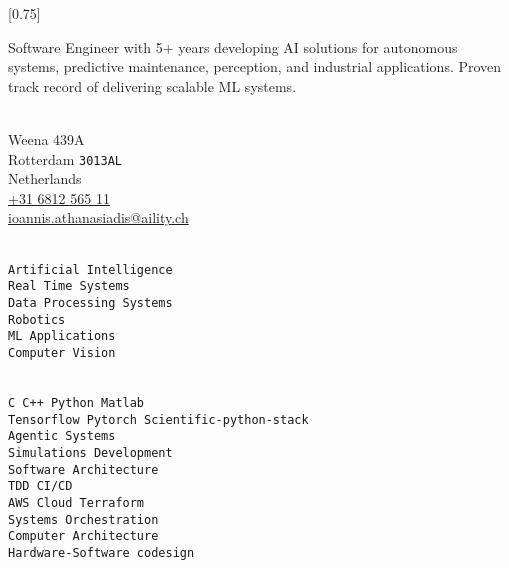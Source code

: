 \documentclass[lighthipster]{simplehipstercv}
\begin{document}
\setlength{\columnsep}{0.8cm}
[0.75]
\begin{paracol}{2}

\paracolbackgroundoptions


\footnotesize
{\setasidefontcolour
\flushright
\begin{center}
Software Engineer with 5+ years developing AI solutions for autonomous systems, predictive maintenance, perception, and industrial applications. Proven track record of delivering scalable ML systems.
\end{center}
\bigskip

\bigskip

\\[0.5em]
{\footnotesize
Weena 439A\\ %
Rotterdam \texttt{3013AL}\\
Netherlands\\[.2cm]
\href{tel:+31681256511}{+31 6812 565 11}\\ %
\href{mailto:ioannis.athanasiadis@aility.ch}{ioannis.athanasiadis@aility.ch}} %
\bigskip

\bigskip

\\[0.5em]
\texttt{Artificial Intelligence}\\[0.1em]
\texttt{Real Time Systems}\\[0.1em]
\texttt{Data Processing Systems}\\[0.1em]
\texttt{Robotics}\\[0.1em]
\texttt{ML Applications}\\[0.1em]
\texttt{Computer Vision}\\[0.1em]
\bigskip

\bigskip

\\[0.5em]
\texttt{C C++ Python Matlab}\\
\texttt{Tensorflow Pytorch Scientific-python-stack}\\
\texttt{Agentic Systems}\\
\texttt{Simulations Development}\\
\texttt{Software Architecture}\\
\texttt{TDD CI/CD}\\
\texttt{AWS Cloud Terraform}\\
\texttt{Systems Orchestration}\\
\texttt{Computer Architecture}\\
\texttt{Hardware-Software codesign}
\bigskip

}
\end{paracol}
\end{document}

